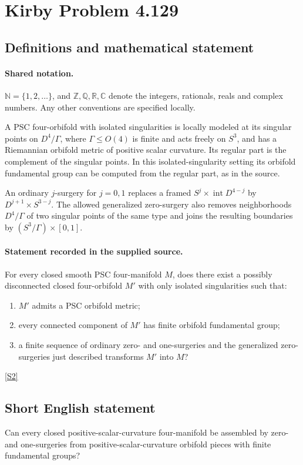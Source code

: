 \documentclass[11pt]{article}
\newcommand{\sref}[2]{\hyperlink{source:#1:#2}{[S#2]}}
\begin{document}
\section{Kirby Problem 4.129}\label{statement}

\subsection{Definitions and mathematical statement}

\paragraph{Shared notation.}$\mathbb N=\{1,2,\ldots\}$, and $\mathbb Z,\mathbb Q,\mathbb R,\mathbb C$ denote the integers, rationals, reals and complex numbers. Any other conventions are specified locally.


A PSC four-orbifold with isolated singularities is locally modeled at its singular points on $D^4/\Gamma$, where $\Gamma\leq O(4)$ is finite and acts freely on $S^3$, and has a Riemannian orbifold metric of positive scalar curvature. Its regular part is the complement of the singular points. In this isolated-singularity setting its orbifold fundamental group can be computed from the regular part, as in the source.

An ordinary $j$-surgery for $j=0,1$ replaces a framed $S^j\times\operatorname{int}D^{4-j}$ by $D^{j+1}\times S^{3-j}$. The allowed generalized zero-surgery also removes neighborhoods $D^4/\Gamma$ of two singular points of the same type and joins the resulting boundaries by $(S^3/\Gamma)\times[0,1]$.
\paragraph{Statement recorded in the supplied source.}
For every closed smooth PSC four-manifold $M$, does there exist a possibly disconnected closed four-orbifold $M'$ with only isolated singularities such that:
\begin{enumerate}
\item $M'$ admits a PSC orbifold metric;
\item every connected component of $M'$ has finite orbifold fundamental group;
\item a finite sequence of ordinary zero- and one-surgeries and the generalized zero-surgeries just described transforms $M'$ into $M$?
\end{enumerate} \sref{statement}{2}
\subsection{Short English statement}
Can every closed positive-scalar-curvature four-manifold be assembled by zero- and one-surgeries from positive-scalar-curvature orbifold pieces with finite fundamental groups?
\end{document}
